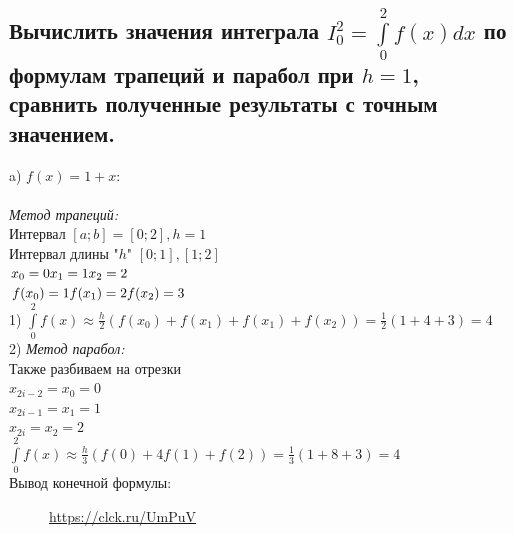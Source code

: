 \documentclass{article}
\begin{document}
\subsection{Вычислить значения интеграла $ I^2_0 = \int\limits^2_0 f(x)dx $ по формулам трапеций и парабол при $ h = 1 $, сравнить полученные результаты с точным значением.}
\Large a) $ f(x) = 1 + x $:\\\\
\large\textit{Метод трапеций:}\\
\normalsize
Интервал $ [a; b] = [0; 2], h = 1 $\\
Интервал длины "$h$" $ [0; 1], [1; 2] $\\
$ x_0 = 0 \\ x_1 = 1 \\ x_2 = 2 $\\
$ f(x_0) = 1 \\ f(x_1) = 2 \\ f(x_2) = 3 $\\
1) $ \int\limits^2_0 f(x) \approx \frac{h}{2} (f(x_0) + f(x_1) + f(x_1) + f(x_2)) = \frac{1}{2} (1+4+3) = 4 $\\
2) \large\textit{Метод парабол:}\\
\normalsize
Также разбиваем на отрезки\\
$ x_{2i-2} = x_0 = 0 $\\
$ x_{2i-1} = x_1 = 1 $\\
$ x_{2i} = x_2 = 2 $\\
$ \int\limits^2_0 f(x) \approx \frac{h}{3} (f(0) + 4f(1) + f(2)) = \frac{1}{3} (1 + 8 + 3) = 4 $\\
\small Вывод конечной формулы:
\normalsize
\begin{figure}[h!]
\caption*{\url{https://clck.ru/UmPuV}}
\end{figure}\\
\end{document}
